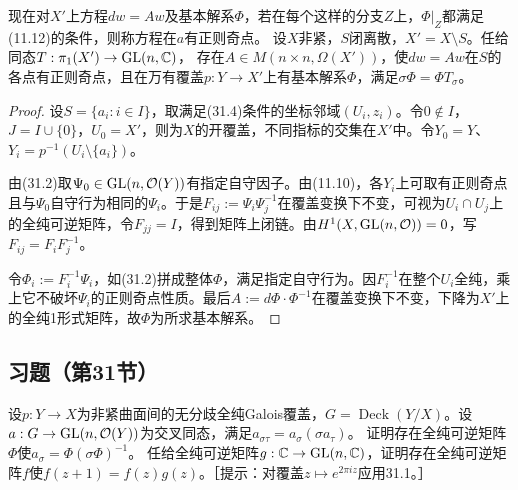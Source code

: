 现在对$X'$上方程$dw=Aw$及基本解系$\Phi$，若在每个这样的分支$Z$上，$\Phi|_Z$都满足(11.12)的条件，则称方程在$a$有正则奇点。
设$X$非紧，$S$闭离散，$X'=X\setminus S$。任给同态$T:\pi_1(X')\to\operatorname{GL}(n,\mathbb C)$，
存在$A\in M(n\times n,\Omega(X'))$，使$dw=Aw$在$S$的各点有正则奇点，且在万有覆盖$p:Y\to X'$上有基本解系$\Phi$，满足$\sigma\Phi=\Phi T_\sigma$。
\begin{proof}
设$S=\{a_i:i\in I\}$，取满足(31.4)条件的坐标邻域$(U_i,z_i)$。令$0\notin I$，$J=I\cup\{0\}$，$U_0=X'$，则为$X$的开覆盖，不同指标的交集在$X'$中。令$Y_0=Y$、$Y_i=p^{-1}(U_i\setminus\{a_i\})$。

由(31.2)取$\Psi_0\in\operatorname{GL}(n,\mathcal O(Y))$有指定自守因子。由(11.10)，各$Y_i$上可取有正则奇点且与$\Psi_0$自守行为相同的$\Psi_i$。于是$F_{ij}:=\Psi_i\Psi_j^{-1}$在覆盖变换下不变，可视为$U_i\cap U_j$上的全纯可逆矩阵，令$F_{jj}=I$，得到矩阵上闭链。由$H^1(X,\operatorname{GL}(n,\mathcal O))=0$，写$F_{ij}=F_iF_j^{-1}$。

令$\Phi_i:=F_i^{-1}\Psi_i$，如(31.2)拼成整体$\Phi$，满足指定自守行为。因$F_i^{-1}$在整个$U_i$全纯，乘上它不破坏$\Psi_i$的正则奇点性质。最后$A:=d\Phi\cdot\Phi^{-1}$在覆盖变换下不变，下降为$X'$上的全纯1形式矩阵，故$\Phi$为所求基本解系。
\end{proof}
\subsection*{习题（第31节）}
设$p:Y\to X$为非紧曲面间的无分歧全纯Galois覆盖，$G=\operatorname{Deck}(Y/X)$。设$a:G\to\operatorname{GL}(n,\mathcal O(Y))$为交叉同态，满足$a_{\sigma\tau}=a_\sigma(\sigma a_\tau)$。
证明存在全纯可逆矩阵$\Phi$使$a_\sigma=\Phi(\sigma\Phi)^{-1}$。
任给全纯可逆矩阵$g:\mathbb C\to\operatorname{GL}(n,\mathbb C)$，证明存在全纯可逆矩阵$f$使$f(z+1)=f(z)g(z)$。［提示：对覆盖$z\mapsto e^{2\pi iz}$应用31.1。］
